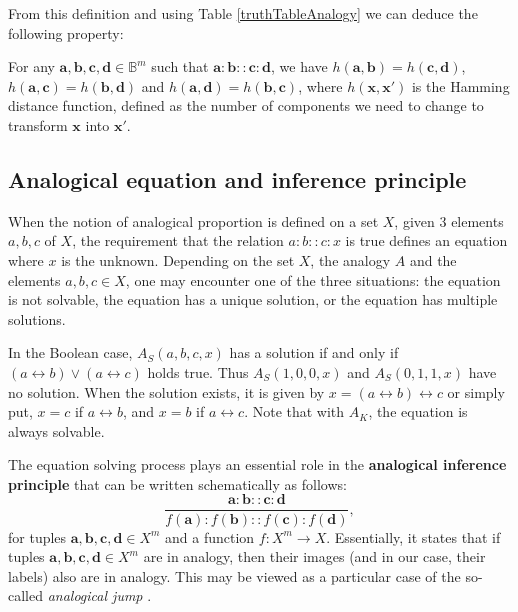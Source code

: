 \documentclass[article]{amsart}
\begin{document}
From this definition and using Table \ref{truthTableAnalogy} we can deduce the
following property:

\begin{proper}\label{hamming_analogy}
  For any $\mathbf{a}, \mathbf{b}, \mathbf{c}, \mathbf{d} \in \mathbb{B}^m$
  such that $\mathbf{a} : \mathbf{b} :: \mathbf{c} : \mathbf{d}$, we have
  $h(\mathbf{a}, \mathbf{b})=h(\mathbf{c}, \mathbf{d})$, $h(\mathbf{a},
  \mathbf{c})=h(\mathbf{b}, \mathbf{d})$ and $h(\mathbf{a},
  \mathbf{d})=h(\mathbf{b}, \mathbf{c})$, where $h(\mathbf{x}, \mathbf{x}')$ is
  the Hamming distance function, defined as the number of components we need to
  change to transform $\mathbf{x}$ into $\mathbf{x}'$.
\end{proper}

\subsection{Analogical equation and  inference
principle}\label{anaequa}

When the notion of analogical proportion is defined on a set $X$, given 3
elements $a,b,c$ of $X$, the requirement that the relation $a : b :: c : x$ is true
defines an equation where $x$ is the unknown.  Depending on the set $X$, the
analogy $A$ and the elements $a,b,c\in X$, one may encounter one of the three
situations: the equation is not solvable, the equation has a unique solution,
or the equation has multiple solutions.

In the Boolean case, $A_S(a, b, c, x)$ has a solution if and only if $(a
\leftrightarrow b)\vee(a \leftrightarrow c)$ holds true.  Thus $A_S(1, 0, 0, x)$ and
$A_S(0, 1, 1, x)$ have no solution. When the solution exists, it is given by
$x=(a \leftrightarrow b)\leftrightarrow c$ or simply put, $x = c$ if $a
\leftrightarrow b$, and $x = b$ if $a \leftrightarrow c$. Note that with $A_K$,
the equation is always solvable.

The equation solving process plays an essential role in the {\bf analogical
inference principle} that can be written schematically as follows:
$$\frac{\mathbf{a} :  \mathbf{b} ::  \mathbf{c} :  \mathbf{d}}{f(\mathbf{a}) :
f(\mathbf{b}) :: f(\mathbf{c}) : f(\mathbf{d})},$$
for tuples $\mathbf{a},\mathbf{b},\mathbf{c},\mathbf{d}\in X^m$ and a function
$f\colon X^m\to X$.  Essentially, it states that if tuples
$\mathbf{a},\mathbf{b},\mathbf{c},\mathbf{d}\in X^m$ are in analogy,
then their images (and in our case, their labels) also are in analogy.
This may be viewed as a particular case of the so-called
\textit{analogical jump} \cite{DavRus1987}.
\end{document}
